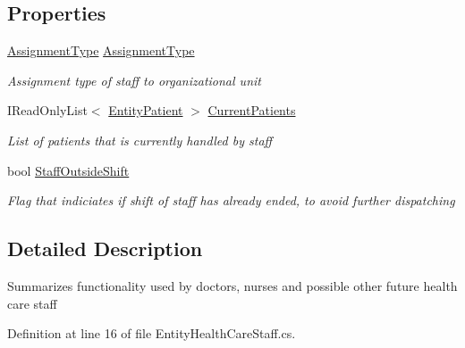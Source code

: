\subsection*{Properties}
\begin{DoxyCompactItemize}
\item 
\hyperlink{namespace_enums_ac8e46c12834f4cb6a641854bd0676221}{Assignment\+Type} \hyperlink{class_general_health_care_elements_1_1_entities_1_1_entity_health_care_staff_a851d30cddf0003c22f7d6ef5c157e6c9}{Assignment\+Type}
\begin{DoxyCompactList}\small\item\em Assignment type of staff to organizational unit \end{DoxyCompactList}\item 
I\+Read\+Only\+List$<$ \hyperlink{class_general_health_care_elements_1_1_entities_1_1_entity_patient}{Entity\+Patient} $>$ \hyperlink{class_general_health_care_elements_1_1_entities_1_1_entity_health_care_staff_a12a663755022b9c8a4111f57b8f6281b}{Current\+Patients}
\begin{DoxyCompactList}\small\item\em List of patients that is currently handled by staff \end{DoxyCompactList}\item 
bool \hyperlink{class_general_health_care_elements_1_1_entities_1_1_entity_health_care_staff_ae0dd52d6060395967901a763dac269ea}{Staff\+Outside\+Shift}
\begin{DoxyCompactList}\small\item\em Flag that indiciates if shift of staff has already ended, to avoid further dispatching \end{DoxyCompactList}\end{DoxyCompactItemize}


\subsection{Detailed Description}
Summarizes functionality used by doctors, nurses and possible other future health care staff 



Definition at line 16 of file Entity\+Health\+Care\+Staff.\+cs.



